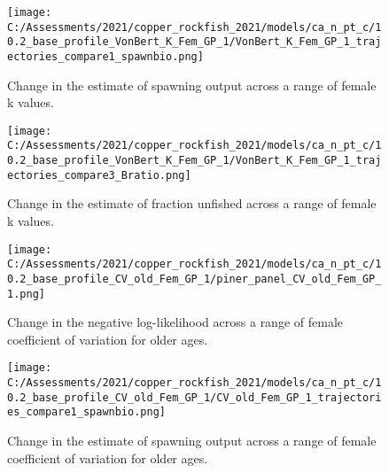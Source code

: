 \documentclass[11pt,
  english,
  a4paper,
]{article}
\begin{document}
\tagmcend\tagstructend


\begin{figure}
\centering
\texttt{[image: C:/Assessments/2021/copper\_rockfish\_2021/models/ca\_n\_pt\_c/10.2\_base\_profile\_VonBert\_K\_Fem\_GP\_1/VonBert\_K\_Fem\_GP\_1\_trajectories\_compare1\_spawnbio.png]}
\caption{Change in the estimate of spawning output across a range of female k values.\label{fig:k-ssb}}
\end{figure}

\tagmcend\tagstructend


\begin{figure}
\centering
\texttt{[image: C:/Assessments/2021/copper\_rockfish\_2021/models/ca\_n\_pt\_c/10.2\_base\_profile\_VonBert\_K\_Fem\_GP\_1/VonBert\_K\_Fem\_GP\_1\_trajectories\_compare3\_Bratio.png]}
\caption{Change in the estimate of fraction unfished across a range of female k values.\label{fig:k-depl}}
\end{figure}

\tagmcend\tagstructend


\begin{figure}
\centering
\texttt{[image: C:/Assessments/2021/copper\_rockfish\_2021/models/ca\_n\_pt\_c/10.2\_base\_profile\_CV\_old\_Fem\_GP\_1/piner\_panel\_CV\_old\_Fem\_GP\_1.png]}
\caption{Change in the negative log-likelihood across a range of female coefficient of variation for older ages.\label{fig:cv-profile}}
\end{figure}

\tagmcend\tagstructend


\begin{figure}
\centering
\texttt{[image: C:/Assessments/2021/copper\_rockfish\_2021/models/ca\_n\_pt\_c/10.2\_base\_profile\_CV\_old\_Fem\_GP\_1/CV\_old\_Fem\_GP\_1\_trajectories\_compare1\_spawnbio.png]}
\caption{Change in the estimate of spawning output across a range of female coefficient of variation for older ages.\label{fig:cv-ssb}}
\end{figure}
\end{document}
